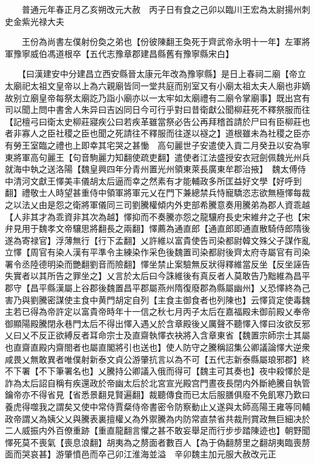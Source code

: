 　　普通元年春正月乙亥朔改元大赦　丙子日有食之己卯以臨川王宏為太尉揚州刺史金紫光禄大夫

　　王份為尚書左僕射份奐之弟也【份彼陳翻王奐死于齊武帝永明十一年】左軍將軍豫寧威伯馮道根卒【五代志豫章郡建昌縣舊有豫寧縣宋白】

　　【曰漢建安中分建昌立西安縣晉太康元年改為豫寧縣】是日上春祠二廟【帝立太廟祀太祖文皇帝以上為六親廟皆同一堂共庭而别室又有小廟太祖太夫人廟也非嫡故别立廟皇帝每祭太廟訖乃詣小廟亦以一太牢如太廟禮有二廟令掌廟事】既出宫有司以聞上問中書舍人朱异曰吉凶同日今可行乎對曰昔衛獻公聞柳莊死不釋祭服而往【記檀弓曰衛太史柳莊寢疾公曰若疾革雖當祭必告公再拜稽首請於尸曰有臣柳莊也者非寡人之臣社稷之臣也聞之死請往不釋服而往遂以襚之】道根雖未為社稷之臣亦有勞王室臨之禮也上即幸其宅哭之甚慟　高句麗世子安遣使入貢二月癸丑以安為寧東將軍高句麗王【句音駒麗力知翻使疏吏翻】遣使者江法盛授安衣冠劍佩魏光州兵就海中執之送洛陽【魏皇興四年分青州置光州領東萊長廣東牟郡治掖】　魏太傅侍中清河文獻王懌美丰儀胡太后逼而幸之然素有才能輔政多所匡益好文學【好呼到翻】禮敬士人時望甚重侍中領軍將軍元乂在門下兼總禁兵恃寵驕恣志欲無極懌每裁之以法乂由是怨之衛將軍儀同三司劉騰權傾内外吏部希騰意奏用騰弟為郡人資乖越【人非其才為乖資非其次為越】懌抑而不奏騰亦怨之龍驤府長史宋維弁之子也【宋弁見用于魏孝文帝驤思將翻長之兩翻】懌薦為通直郎【通直郎即通直散騎侍郎隋後遂為寄禄官】浮薄無行【行下孟翻】乂許維以富貴使告司染都尉韓文殊父子謀作亂立懌【周官有染人漢有平準令主練染作采色後魏置司染都尉後齊太府寺屬官有司染署令丞陸德明染而艷翻劉音而險翻】懌坐禁止案驗無反狀得釋維當反坐【反坐誣告失實者以其所告之罪坐之】乂言於太后曰今誅維後有真反者人莫敢告乃黜維為昌平郡守【昌平縣漢屬上谷郡後魏置昌平郡屬燕州隋復廢郡為縣屬幽州】乂恐懌終為己害乃與劉騰密謀使主食中黄門胡定自列【主食主御食者也列陳也】云懌貨定使毒魏主若已得為帝許定以富貴帝時年十一信之秋七月丙子太后在嘉福殿未御前殿乂奉帝御顯陽殿騰閉永巷門太后不得出懌入遇乂於含章殿後乂厲聲不聽懌入懌曰汝欲反邪乂曰乂不反正欲縛反者耳命宗士及直齋執懌衣袂將入含章東省【魏置宗師宗士其屬也直齋直殿内齋閤者也屬直閣將引也送也】使人防守之騰稱詔集公卿議論懌大逆衆咸畏乂無敢異者唯僕射新泰文貞公游肇抗言以為不可【五代志新泰縣屬琅邪郡】終不下署【不下筆署名也】乂騰持公卿議入俄而得可【魏主可其奏也】夜中殺懌於是詐為太后詔自稱有疾還政於帝幽太后於北宮宣光殿宫門晝夜長閉内外斷絶騰自執管鑰帝亦不得省見【省悉景翻見賢遍翻】裁聽傳食而已太后服膳俱廢不免飢寒乃歎曰養虎得噬我之謂矣又使中常侍賈粲侍帝書密令防察動止乂遂與太師高陽王雍等同輔政帝謂乂為姨父乂與騰表裏擅權乂為外禦騰為内防常直禁省共裁刑賞政無巨細决於二人威振内外百僚重跡【重直龍翻言懼之甚不敢妄舉足而行步步踏陳迹也】朝野聞懌死莫不喪氣【喪息浪翻】胡夷為之剺面者數百人【為于偽翻剺里之翻胡夷臨喪剺面而哭哀甚】游肇憤邑而卒己卯江淮海並溢　辛卯魏主加元服大赦改元正

